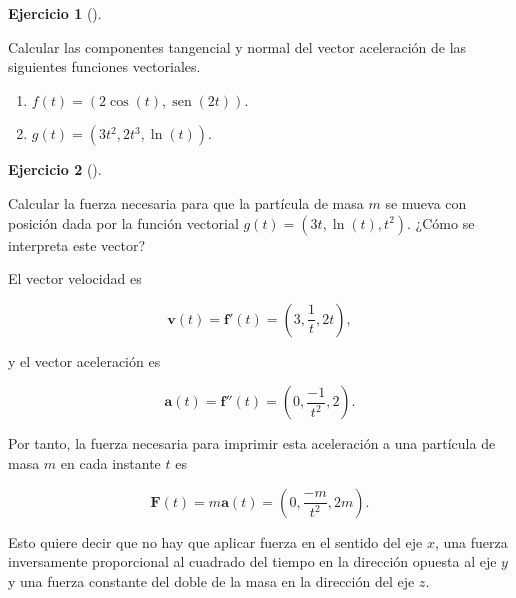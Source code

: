 \documentclass[
  spanish,
  a4paper,
]{scrreport}
\providecommand{\tightlist}{%
  \setlength{\itemsep}{0pt}\setlength{\parskip}{0pt}}
\theoremstyle{definition}
\newtheorem{exercise}{Ejercicio}[chapter]
\theoremstyle{remark}
\begin{document}
\begin{tcolorbox}
\end{tcolorbox}

\begin{exercise}[]\protect\hypertarget{exr-componentes-tangencial-normal}{}\label{exr-componentes-tangencial-normal}

Calcular las componentes tangencial y normal del vector aceleración de
las siguientes funciones vectoriales.

\begin{enumerate}
\def\labelenumi{\alph{enumi}.}
\tightlist
\item
  \(f(t) = (2\cos(t), \operatorname{sen}(2t))\).
\item
  \(g(t) = (3t^2, 2t^3, \ln(t))\).
\end{enumerate}

\end{exercise}

\begin{exercise}[]\protect\hypertarget{exr-cinematica-fuerza-1}{}\label{exr-cinematica-fuerza-1}

Calcular la fuerza necesaria para que la partícula de masa \(m\) se
mueva con posición dada por la función vectorial
\(g(t) = (3t, \ln(t), t^2)\). ¿Cómo se interpreta este vector?

\end{exercise}

\begin{tcolorbox}[enhanced jigsaw, arc=.35mm, bottomrule=.15mm, bottomtitle=1mm, breakable, colback=white, colbacktitle=quarto-callout-tip-color!10!white, colframe=quarto-callout-tip-color-frame, coltitle=black, left=2mm, leftrule=.75mm, opacityback=0, opacitybacktitle=0.6, rightrule=.15mm, title=\textcolor{quarto-callout-tip-color}{\faLightbulb}\hspace{0.5em}{Solución}, titlerule=0mm, toprule=.15mm, toptitle=1mm]

El vector velocidad es

\[
\mathbf{v}(t)
= \mathbf{f}'(t) 
= \left(3, \frac{1}{t}, 2t\right),
\]

y el vector aceleración es

\[
\mathbf{a}(t)
= \mathbf{f}''(t) 
= \left(0, \frac{-1}{t^2}, 2\right).
\]

Por tanto, la fuerza necesaria para imprimir esta aceleración a una
partícula de masa \(m\) en cada instante \(t\) es

\[
\mathbf{F}(t) 
= m \mathbf{a}(t)
= \left(0, \frac{-m}{t^2}, 2m\right).
\]

Esto quiere decir que no hay que aplicar fuerza en el sentido del eje
\(x\), una fuerza inversamente proporcional al cuadrado del tiempo en la
dirección opuesta al eje \(y\) y una fuerza constante del doble de la
masa en la dirección del eje \(z\).

\end{tcolorbox}
\end{document}
